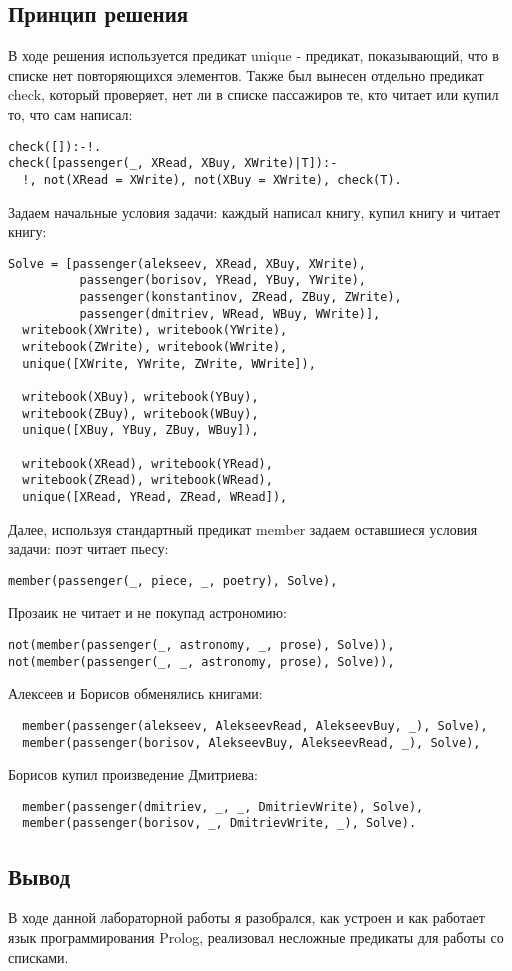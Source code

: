 \documentclass[12pt]{article}
\begin{document}
\subsection*{Принцип решения}
В ходе решения используется предикат unique - предикат, показывающий, что в списке нет повторяющихся элементов. Также был вынесен отдельно предикат check, который проверяет,
нет ли в списке пассажиров те, кто читает или купил то, что сам написал:
\begin{lstlisting}
check([]):-!.
check([passenger(_, XRead, XBuy, XWrite)|T]):-
  !, not(XRead = XWrite), not(XBuy = XWrite), check(T).
\end{lstlisting}
Задаем начальные условия задачи: каждый написал книгу, купил книгу и читает книгу:
\begin{lstlisting}
Solve = [passenger(alekseev, XRead, XBuy, XWrite),
          passenger(borisov, YRead, YBuy, YWrite),
          passenger(konstantinov, ZRead, ZBuy, ZWrite), 
          passenger(dmitriev, WRead, WBuy, WWrite)],
  writebook(XWrite), writebook(YWrite),
  writebook(ZWrite), writebook(WWrite),
  unique([XWrite, YWrite, ZWrite, WWrite]),
  
  writebook(XBuy), writebook(YBuy),
  writebook(ZBuy), writebook(WBuy),
  unique([XBuy, YBuy, ZBuy, WBuy]),
  
  writebook(XRead), writebook(YRead),
  writebook(ZRead), writebook(WRead),
  unique([XRead, YRead, ZRead, WRead]),
\end{lstlisting}

Далее, используя стандартный предикат
member задаем оставшиеся условия задачи: поэт читает пьесу:
\begin{lstlisting}
member(passenger(_, piece, _, poetry), Solve),
\end{lstlisting}
Прозаик не читает и не покупад астрономию:
\begin{lstlisting}
not(member(passenger(_, astronomy, _, prose), Solve)),
not(member(passenger(_, _, astronomy, prose), Solve)),
\end{lstlisting}
Алексеев и Борисов обменялись книгами:
\begin{lstlisting}
  member(passenger(alekseev, AlekseevRead, AlekseevBuy, _), Solve),
  member(passenger(borisov, AlekseevBuy, AlekseevRead, _), Solve),
\end{lstlisting}
Борисов купил произведение Дмитриева:
\begin{lstlisting}
  member(passenger(dmitriev, _, _, DmitrievWrite), Solve),
  member(passenger(borisov, _, DmitrievWrite, _), Solve).
\end{lstlisting}

\subsection*{Вывод}
В ходе данной лабораторной работы я разобрался, как устроен и как работает язык программирования Prolog, реализовал несложные предикаты для работы со
списками. 
\end{document}
